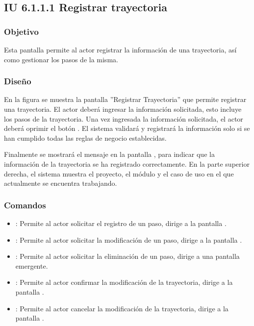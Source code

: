 \subsection{IU 6.1.1.1 Registrar trayectoria}

\subsubsection{Objetivo}
	Esta pantalla permite al actor registrar la información de una trayectoria, así como gestionar los pasos de la misma.
\subsubsection{Diseño}
	En la figura  se muestra la pantalla ''Registrar Trayectoria'' que permite registrar una trayectoria. El actor deberá ingresar la información solicitada, esto incluye los pasos de la trayectoria.
	Una vez ingresada la información solicitada, el actor deberá oprimir el botón  . El sistema validará y registrará la información solo si se han cumplido todas las reglas de negocio establecidas.
	
	Finalmente se mostrará el mensaje  en la pantalla , para indicar que la información de la trayectoria se ha registrado correctamente.
	En la parte superior derecha, el sistema muestra el proyecto, el módulo y el caso de uso en el que actualmente se encuentra trabajando.

\subsubsection{Comandos}
\begin{itemize}
	\item {}: Permite al actor solicitar el registro de un paso, dirige a la pantalla .
	\item \editar [Modificar]: Permite al actor solicitar la modificación de un paso, dirige a la pantalla .
	\item \eliminar [Eliminar]: Permite al actor solicitar la eliminación de un paso, dirige a una pantalla emergente.
	\item {}: Permite al actor confirmar la modificación de la trayectoria, dirige a la pantalla .
	\item {}: Permite al actor cancelar la modificación de la trayectoria, dirige a la pantalla .
\end{itemize}

